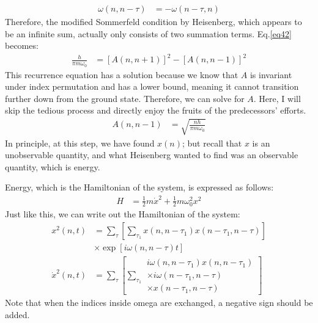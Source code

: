\documentclass[a4paper, 12pt, oneside, onecolumn]{article}
\begin{document}
\begin{multicols}{2}
\begin{align}
	\omega \left( n, n - \tau \right)
	&= - \omega \left( n - \tau, n \right)
\end{align}
Therefore, the modified Sommerfeld condition by Heisenberg, which appears to be an infinite sum, actually only consists of two summation terms. Eq.\ref{eq42} becomes:
\begin{align}
	\frac{h}{\pi m \omega_0}
	&= \left[ A \left( n, n + 1 \right) \right]^2 - \left[ A \left( n, n - 1 \right) \right]^2
\end{align}
This recurrence equation has a solution because we know that $A$ is invariant under index permutation and has a lower bound, meaning it cannot transition further down from the ground state. Therefore, we can solve for $A$. Here, I will skip the tedious process and directly enjoy the fruits of the predecessors' efforts.
\begin{align}
	A \left( n, n - 1 \right)
	&= \sqrt{\frac{n h}{\pi m \omega_0}}
\end{align}
In principle, at this step, we have found $x\left( n \right)$; but recall that $x$ is an unobservable quantity, and what Heisenberg wanted to find was an observable quantity, which is energy.

Energy, which is the Hamiltonian of the system, is expressed as follows:
\begin{align}
	H
	&= \frac{1}{2} m \dot x^2 + \frac{1}{2} m \omega_0^2 x^2
\end{align}
Just like this, we can write out the Hamiltonian of the system:
\begin{align}
	x^2 \left( n, t \right)
	&= \sum_\tau \left[ \sum_{\tau_1} x \left( n, n - \tau_1 \right) x \left( n - \tau_1, n - \tau \right) \right] \nonumber \\
	&\times \exp\left[ i \omega \left( n, n - \tau \right) t \right] \\
	\dot x^2 \left( n, t \right)
	&= \sum_{\tau} \left[ \sum_{\tau_1}
	\begin{matrix}
	i \omega \left( n, n - \tau_1 \right) x \left( n, n - \tau_1 \right) \\
	\times i \omega \left( n - \tau_1, n - \tau \right) \\
	\times x \left( n - \tau_1, n - \tau \right)
	\end{matrix} 
	\right]
\end{align}
Note that when the indices inside omega are exchanged, a negative sign should be added.


\end{multicols}
\end{document}
